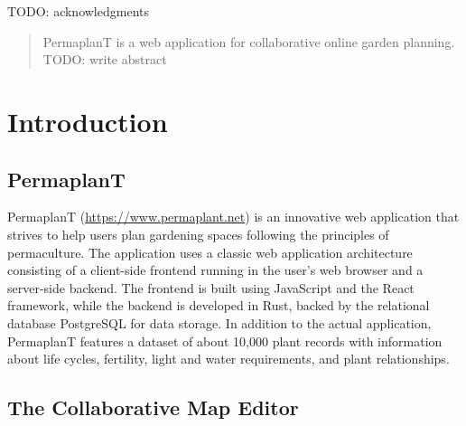 \documentclass[final,oneside]{vutinfth}
\begin{document}
\frontmatter

\addstatementpage

\begin{acknowledgements*}

TODO: acknowledgments

\end{acknowledgements*}

\begin{abstract}
    PermaplanT is a web application for collaborative online garden planning. TODO: write abstract
\end{abstract}



\tableofcontents %

\mainmatter

\chapter{Introduction}

\section{PermaplanT}

PermaplanT (\url{https://www.permaplant.net}) is an innovative web application that strives to help users plan gardening spaces following the principles of permaculture.
The application uses a classic web application architecture consisting of a client-side frontend running in the user's web browser and a server-side backend.
The frontend is built using JavaScript and the React framework, while the backend is developed in Rust, backed by the relational database PostgreSQL for data storage.
In addition to the actual application, PermaplanT features a dataset of about 10,000 plant records with information about life cycles, fertility, light and water requirements, and plant relationships.

\section{The Collaborative Map Editor}
\end{document}
